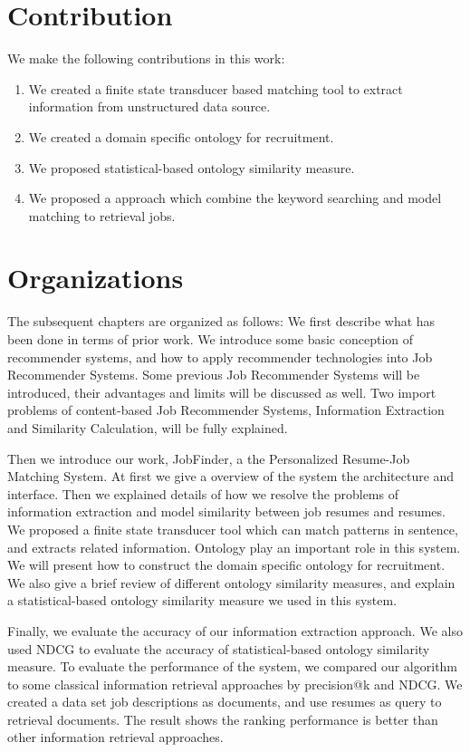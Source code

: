 \section{Contribution}

We make the following contributions in this work:

\begin{enumerate}
    \item  We created a finite state transducer based matching tool to extract information from unstructured data source.
    \item  We created a domain specific ontology for recruitment.
    \item  We proposed statistical-based ontology similarity measure.
    \item  We proposed a approach which combine the keyword searching and model matching to retrieval jobs.
\end{enumerate}

\section{Organizations}
The subsequent chapters are organized as follows: We first describe what has been done in terms of prior work.  We introduce some basic conception of recommender systems, and how to apply recommender technologies into Job Recommender Systems. Some previous Job Recommender Systems will be introduced,  their advantages and limits will be discussed as well.  Two import problems of content-based Job Recommender Systems, Information Extraction and Similarity Calculation, will be fully explained.

Then we introduce our work, JobFinder, a the Personalized Resume-Job Matching System. At first we give a overview of the system the architecture and interface. Then we explained details of how we resolve the problems of information extraction and model similarity between job resumes and resumes. We proposed a finite state transducer tool which can match patterns in sentence, and extracts related information. Ontology play an important role in this system. We will present how to construct the domain specific ontology for recruitment. We also give a brief review of different ontology similarity measures, and explain   a statistical-based ontology similarity measure we used in this system.

Finally, we evaluate the accuracy of our information extraction approach.  We also used NDCG to evaluate the accuracy of statistical-based ontology similarity measure. To evaluate the performance of the system, we compared our algorithm to some classical information retrieval approaches by precision@k and NDCG. We created a data set job descriptions as documents, and use resumes as query to retrieval documents. The result shows the ranking performance is better than other information retrieval approaches.
